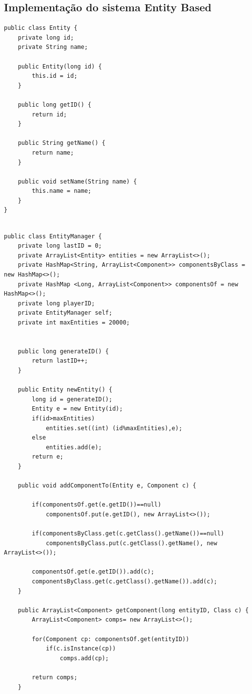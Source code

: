 \documentclass[12pt, 
openright, 
oneside, 
a4paper,    
brazil]{facom-ufu-abntex2}
\begin{document}
\begin{apendicesenv}
\chapter{Implementação do sistema Entity Based}
\label{apend:alg:entity}
\begin{lstlisting}[caption=Classe Entity]
public class Entity {
	private long id;
	private String name;
	
	public Entity(long id) {
		this.id = id;
	}
	
	public long getID() {
		return id;
	}

	public String getName() {
		return name;
	}

	public void setName(String name) {
		this.name = name;
	}
}
\end{lstlisting}

\begin{lstlisting}[caption=Classe EntityManager responsável por gerenciar as entidades]

public class EntityManager {
	private long lastID = 0;
	private ArrayList<Entity> entities = new ArrayList<>();
	private HashMap<String, ArrayList<Component>> componentsByClass = new HashMap<>();
	private HashMap <Long, ArrayList<Component>> componentsOf = new HashMap<>();
	private long playerID;
	private EntityManager self;
	private int maxEntities = 20000;

	
	public long generateID() {
		return lastID++; 
	}
	
	public Entity newEntity() {
		long id = generateID();
		Entity e = new Entity(id);
		if(id>maxEntities)
			entities.set((int) (id%maxEntities),e);
		else
			entities.add(e);
		return e;
	}
	
	public void addComponentTo(Entity e, Component c) {

		if(componentsOf.get(e.getID())==null)
			componentsOf.put(e.getID(), new ArrayList<>());
		
		if(componentsByClass.get(c.getClass().getName())==null)
			componentsByClass.put(c.getClass().getName(), new ArrayList<>());
		
		componentsOf.get(e.getID()).add(c);
		componentsByClass.get(c.getClass().getName()).add(c);
	}
	
	public ArrayList<Component> getComponent(long entityID, Class c) {
		ArrayList<Component> comps= new ArrayList<>();
		
		for(Component cp: componentsOf.get(entityID))
			if(c.isInstance(cp))
				comps.add(cp);
		
		return comps;
	}
	

\end{lstlisting}
\end{apendicesenv}
\end{document}
